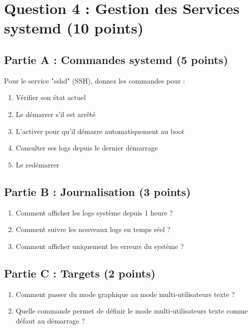 \documentclass[12pt,a4paper]{article}
\begin{document}
\section{Question 4 : Gestion des Services systemd (10 points)}

\begin{questionbox}
\subsection*{Partie A : Commandes systemd (5 points)}
Pour le service "sshd" (SSH), donnez les commandes pour :
\begin{enumerate}[label=\alph*)]
    \item Vérifier son état actuel
    \item Le démarrer s'il est arrêté
    \item L'activer pour qu'il démarre automatiquement au boot
    \item Consulter ses logs depuis le dernier démarrage
    \item Le redémarrer
\end{enumerate}

\subsection*{Partie B : Journalisation (3 points)}
\begin{enumerate}[label=\alph*)]
    \item Comment afficher les logs système depuis 1 heure ?
    \item Comment suivre les nouveaux logs en temps réel ?
    \item Comment afficher uniquement les erreurs du système ?
\end{enumerate}

\subsection*{Partie C : Targets (2 points)}
\begin{enumerate}[label=\alph*)]
    \item Comment passer du mode graphique au mode multi-utilisateurs texte ?
    \item Quelle commande permet de définir le mode multi-utilisateurs texte comme défaut au démarrage ?
\end{enumerate}
\end{questionbox}

\newpage
\end{document}
